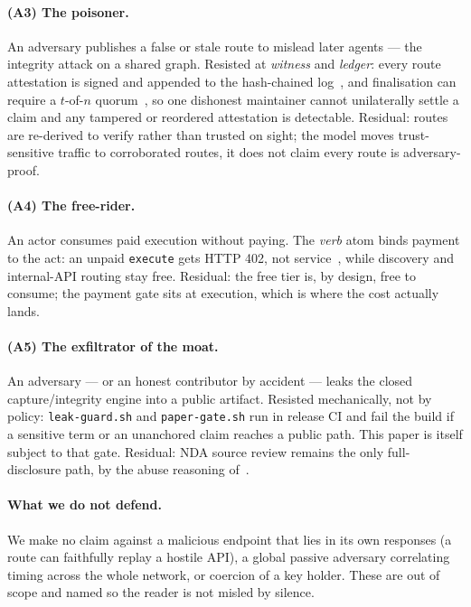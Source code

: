 \documentclass[11pt]{article}
\begin{document}
\paragraph{(A3) The poisoner.} An adversary publishes a false or stale route to
mislead later agents --- the integrity attack on a shared graph. Resisted at
\emph{witness} and \emph{ledger}: every route attestation is signed and appended to
the hash-chained log~\cite{rfc6962}, and finalisation can require a $t$-of-$n$
quorum~\cite{frost}, so one dishonest maintainer cannot unilaterally settle a claim
and any tampered or reordered attestation is detectable. Residual: routes are
re-derived to verify rather than trusted on sight; the model moves trust-sensitive
traffic to corroborated routes, it does not claim every route is adversary-proof.

\paragraph{(A4) The free-rider.} An actor consumes paid execution without paying.
The \emph{verb} atom binds payment to the act: an unpaid \texttt{execute} gets HTTP
402, not service~\cite{x402}, while discovery and internal-API routing stay free.
Residual: the free tier is, by design, free to consume; the payment gate sits at
execution, which is where the cost actually lands.

\paragraph{(A5) The exfiltrator of the moat.} An adversary --- or an honest
contributor by accident --- leaks the closed capture/integrity engine into a public
artifact. Resisted mechanically, not by policy: \texttt{leak-guard.sh} and
\texttt{paper-gate.sh} run in release CI and fail the build if a sensitive term or
an unanchored claim reaches a public path. This paper is itself subject to that
gate. Residual: NDA source review remains the only full-disclosure path, by the
abuse reasoning of~\cite{ossnotice}.

\paragraph{What we do not defend.} We make no claim against a malicious endpoint
that lies in its own responses (a route can faithfully replay a hostile API), a
global passive adversary correlating timing across the whole network, or coercion of
a key holder. These are out of scope and named so the reader is not misled by
silence.
\end{document}
